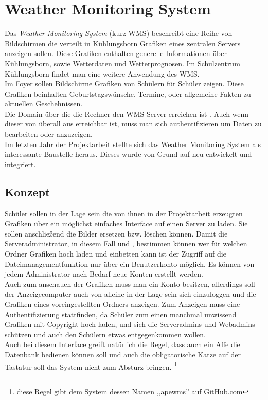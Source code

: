 \section{Weather Monitoring System}
Das \textit{Weather Monitoring System} (kurz WMS) beschreibt eine Reihe von Bildschirmen die verteilt in Kühlungsborn Grafiken eines zentralen Servers anzeigen sollen.
Diese Grafiken enthalten generelle Informationen über Kühlungsborn,
sowie Wetterdaten und Wetterprognosen.
Im Schulzentrum Kühlungsborn findet man eine weitere Anwendung des WMS. \\
Im Foyer sollen Bildschirme Grafiken von Schülern für Schüler zeigen.
Diese Grafiken beinhalten Geburtstagswünsche, Termine, oder allgemeine Fakten zu aktuellen Geschehnissen. \\
Die Domain über die die Rechner den WMS-Server erreichen ist .
Auch wenn dieser von überall aus erreichbar ist,
muss man sich authentifizieren um Daten zu bearbeiten oder anzuzeigen.\\
Im letzten Jahr der Projektarbeit stellte sich das Weather Monitoring System als
interessante Baustelle heraus. Dieses wurde von Grund auf neu entwickelt und integriert.

\subsection{Konzept} %
Schüler sollen in der Lage sein die von ihnen in der Projektarbeit erzeugten Grafiken über ein möglichst einfaches Interface auf einen Server zu laden.
Sie sollen anschließend die Bilder ersetzen bzw. löschen können.
Damit die Serveradministrator, in diesem Fall \mb und \re ,
bestimmen können wer für welchen Ordner Grafiken hoch laden und einbetten kann ist der Zugriff auf die Dateimanagementfunktion nur über ein Benutzerkonto möglich.
Es können von jedem Administrator nach Bedarf neue Konten erstellt werden. \\
Auch zum anschauen der Grafiken muss man ein Konto besitzen,
allerdings soll der Anzeigecomputer auch von alleine in der Lage sein sich einzuloggen und die Grafiken eines voreingestellten Ordners anzeigen.
Zum Anzeigen muss eine Authentifizierung stattfinden,
da Schüler zum einen manchmal unwissend Grafiken mit Copyright hoch laden,
und sich die Serveradmins und Webadmins schützen und auch den
Schülern etwas entgegenkommen wollen. \\
Auch bei diesem Interface greift natürlich die Regel,
dass auch ein Affe die Datenbank bedienen können soll
und auch die obligatorische Katze auf der Tastatur soll das
System nicht zum Absturz bringen. \footnote{diese Regel gibt dem System
dessen Namen ,,apewms'' auf GitHub.com}

